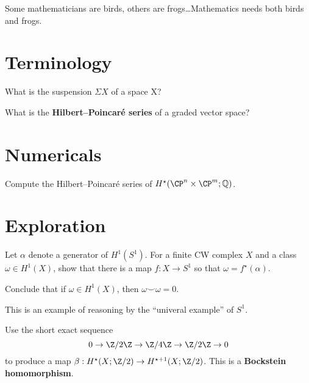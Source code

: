 \documentclass{homework}
\author{Jim Fowler}
\begin{document}
\maketitle

\begin{inspiration} %
Some mathematicians are birds, others are frogs\ldots Mathematics needs both birds and frogs.
\end{inspiration}

\section{Terminology}

\begin{problem}
  What is the suspension $\Sigma X$ of a space X?
\end{problem}

\begin{problem}
  What is the \textbf{Hilbert--Poincar\'e series} of a graded vector space?  
\end{problem}

\section{Numericals}

\begin{problem}
Compute the Hilbert--Poincar\'e series of $H^\star(\CP^n \times \CP^m ; \mathbb{Q})$.
\end{problem}

\section{Exploration}

\begin{problem} Let $\alpha$ denote a generator of $H^1(S^1)$.  For a
finite CW complex $X$ and a class $\omega \in H^1(X)$, show that there
is a map $f : X \to S^1$ so that $\omega = f^\star(\alpha)$.
\end{problem}

\begin{problem}
  Conclude that if $\omega \in H^1(X)$, then $\omega \smile \omega = 0$.
  
  This is an example of reasoning by the ``univeral example'' of $S^1$.
\end{problem}

\begin{problem}
  Use the short exact sequence
  \[
    0 \to \Z/2\Z \to \Z/4\Z \to \Z/2\Z \to 0
  \]
  to produce a map $\beta : H^\star(X;\Z/2) \to H^{\star + 1}(X ; \Z/2)$.  This is a \textbf{Bockstein homomorphism}.
\end{problem}
\end{document}
